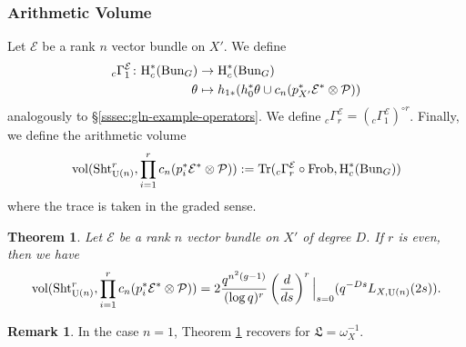 \documentclass[reqno]{amsart}
\numberwithin{equation}{subsection}
\newtheorem{theorem}[subsubsection]{Theorem}
\theoremstyle{definition}
\newtheorem{remark}[subsubsection]{Remark}
\newcommand\cE{\mathcal{E}}
\newcommand\cP{\mathcal{P}}
\newcommand\frL{\mathfrak{L}}
\newcommand{\Bun}{\textup{Bun}}
\newcommand\Frob{\textup{Frob}}
\newcommand\Sht{\textup{Sht}}
\newcommand{\Tr}{\textup{Tr}}
\newcommand{\vol}{\textup{vol}}
\DeclareMathOperator{\U}{U}
\newcommand\ot{\otimes}
\newcommand{\cohoc}[2]{\textup{H}_{c}^{#1}({#2})}     %
\newcommand{\co}{\colon}
\begin{document}
\subsubsection{Arithmetic Volume} Let $\cE$ be a rank $n$ vector bundle on $X'$. We define 
\begin{align*}
{}_c \Gamma_{1}^{\cE} \co \cohoc{*}{\Bun_G} & \rightarrow \cohoc{*}{\Bun_G} \\
 \theta & \mapsto h_{1*} (h_0^* \theta \cup c_n(p_{X'}^* \cE^* \otimes \cP))
\end{align*}
analogously to \S \ref{sssec:gln-example-operators}. We define ${}_c \Gamma_{r}^{\cE} = ({}_c \Gamma_{1}^{\cE})^{\circ r}$. Finally, we define the arithmetic volume 
\[
\vol(\Sht^{r}_{\U(n)}, \prod_{i=1}^{r}c_{n}(p_{i}^{*}\cE^{*}\ot\cP))  := \Tr({}_c \Gamma_{r}^{\cE}\circ\Frob, \cohoc{*}{\Bun_G})
\]
where the trace is taken in the graded sense. 

\begin{theorem}\label{th: vol U} 
Let $\cE$ be a rank $n$ vector bundle on $X'$ of degree $D$. If $r$ is even, then we have 
\begin{equation*}
\vol(\Sht^{r}_{\U(n)}, \prod_{i=1}^{r}c_{n}(p_{i}^{*}\cE^{*}\ot\cP))=2 \frac{q^{n^{2}(g-1)}}{(\log q)^{r}}\left(\frac{d}{ds}\right)^{r}\Big|_{s=0}(q^{-Ds}L_{X,\U(n)}(2s)).
\end{equation*}
\end{theorem}


\begin{remark}
In the case $n=1$, Theorem \ref{th: vol U} recovers \cite[Theorem 10.2]{FYZ2} for $\frL = \omega_X^{-1}$. 
\end{remark}
\end{document}
